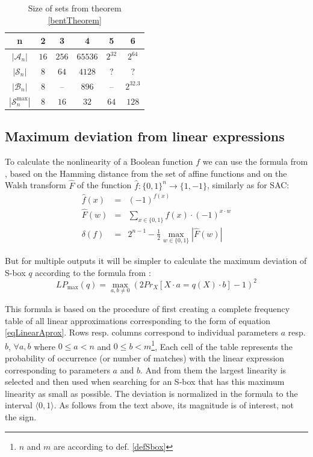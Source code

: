 \begin{table}
\begin{center}
  \begin{tabular}{| c | c | c | c | c | c |}
  \hline
  n & 2 & 3 & 4 & 5 & 6 \\ \hline
  $|\mathcal{A}_n|$ & $16$ & $256$ & $65536$ & $2^{32}$ & $2^{64}$ \\ \hline
  $|\mathcal{S}_n|$ & $8$ & $64$ & $4128$ & ? & ? \\ \hline
  $|\mathcal{B}_n|$ & $8$ & -- & $896$ & -- & $2^{32.3}$ \\ \hline
  $|\mathcal{S}^{\max}_n|$ & $8$ & $16$ & $32$ & $64$ & $128$ \\ \hline
  \end{tabular}
  \caption{Size of sets from theorem \ref{bentTheorem} \cite{yokohama}}
  \label{bentSetTable}
\end{center}
\end{table}

\subsection{Maximum deviation from linear expressions}
To calculate the nonlinearity of a Boolean function $f$ we can use the formula from \cite{yokohama},
based on the Hamming distance from the set of affine functions and on the Walsh transform
$\hat{F}$ of the function $\hat{f}: \{0,1\}^n \rightarrow \{1, -1\}$, similarly as for SAC:
\begin{eqnarray}
  \hat{f}(x) & = & (-1)^{f(x)} \\
  \hat{F}(w) & = & \sum\limits_{x \in \{0,1\}} f(x) \cdot (-1)^{x \cdot w}\\
  \delta(f) & = & 2^{n-1} - \frac{1}{2} \max_{w \in \{0,1\}}|\hat{F}(w)|
\end{eqnarray}

But for multiple outputs it will be simpler to calculate the maximum deviation of S-box $q$
according to the formula from \cite{twofish}:
\begin{equation}
LP_{\max}(q) = \max_{a, b \neq 0} \left( 2 Pr_X[X \cdot a = q(X) \cdot b] - 1 \right)^2
\end{equation}

This formula is based on the procedure of first
creating a complete frequency table of all linear approximations corresponding to the form of equation \ref{eqLinearAprox}.
Rows resp. columns correspond to individual parameters $a$ resp. $b$,
$\forall a, b$ where $0 \leq a < n$ and $0 \leq b < m$\footnote{$n$ and $m$ are according to def. \ref{defSbox}},
Each cell of the table \cite{tutorialLADA} represents
the probability of occurrence (or number of matches) with the linear expression corresponding to parameters $a$ and $b$. And from them
the largest linearity is selected and then used when searching for an S-box that has
this maximum linearity as small as possible.
The deviation is normalized in the formula to the interval $\langle 0,1 \rangle$.
As follows from the text above, its magnitude is of interest, not the sign.


